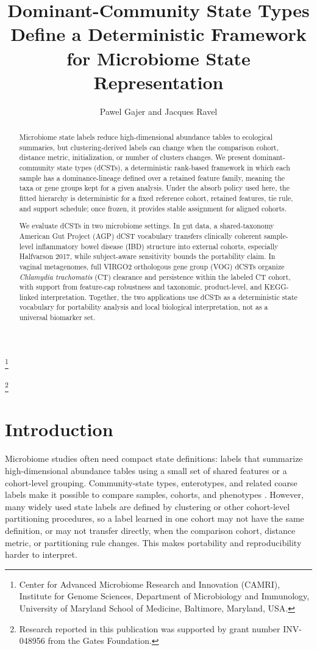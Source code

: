 \documentclass[11pt]{article}
\title{Dominant-Community State Types Define a Deterministic Framework for Microbiome State Representation}
\author{Pawel Gajer and Jacques Ravel}
\date{}
\newcommand{\paperaffiliation}{Center for Advanced Microbiome Research and Innovation (CAMRI), Institute for Genome Sciences, Department of Microbiology and Immunology, University of Maryland School of Medicine, Baltimore, Maryland, USA.}
\newcommand{\paperfundingnote}{Research reported in this publication was supported by grant number INV-048956 from the Gates Foundation.}
\newcommand{\blfootnote}[1]{%
  \begingroup
  \renewcommand{\thefootnote}{}\footnote{#1}%
  \addtocounter{footnote}{-1}%
  \endgroup}
\newif\ifshowbuildstamp
\providecommand{\manuscriptbuilddatetime}{unknown}
\begin{document}
\maketitle
\ifshowbuildstamp
\begin{center}
\footnotesize
Build: \manuscriptbuilddatetime
\end{center}
\vspace{0.35em}
\fi
\blfootnote{\paperaffiliation}
\blfootnote{\paperfundingnote}

\begin{abstract}
Microbiome state labels reduce high-dimensional abundance tables to ecological
summaries, but clustering-derived labels can change when the comparison cohort,
distance metric, initialization, or number of clusters changes. We present
dominant-community state types (dCSTs), a deterministic rank-based framework in
which each sample has a dominance-lineage defined over a retained feature
family, meaning the taxa or gene groups kept for a given analysis. Under the
absorb policy used here, the fitted hierarchy is deterministic for a fixed
reference cohort, retained features, tie rule, and support schedule; once
frozen, it provides stable assignment for aligned cohorts.

We evaluate dCSTs in two microbiome settings. In gut data, a shared-taxonomy
American Gut Project (AGP) dCST vocabulary transfers clinically coherent
sample-level inflammatory bowel disease (IBD) structure into external cohorts,
especially Halfvarson 2017, while subject-aware sensitivity bounds the
portability claim. In vaginal metagenomes, full VIRGO2 orthologous gene group
(VOG) dCSTs organize \textit{Chlamydia trachomatis} (CT) clearance and
persistence within the labeled CT cohort, with support from feature-cap
robustness and taxonomic, product-level, and KEGG-linked interpretation.
Together, the two applications use dCSTs as a deterministic state vocabulary for
portability analysis and local biological interpretation, not as a universal
biomarker set.
\end{abstract}

\section{Introduction}

Microbiome studies often need compact state definitions: labels that summarize
high-dimensional abundance tables using a small set of shared features or a
cohort-level grouping. Community-state types, enterotypes, and related coarse
labels make it possible to compare samples, cohorts, and phenotypes
\cite{Ravel2011_CST,Gajer2012_CST,Arumugam2011_enterotypes}. However, many
widely used state labels are defined by clustering or other cohort-level
partitioning procedures, so a label learned in one cohort may not have the same
definition, or may not transfer directly, when the comparison cohort, distance
metric, or partitioning rule changes. This makes portability and
reproducibility harder to interpret.
\end{document}

